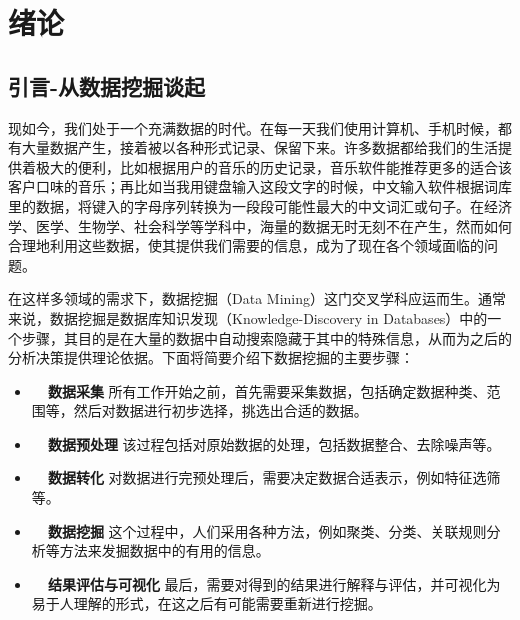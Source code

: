 
\chapter{绪论}
\section{引言-从数据挖掘谈起}
现如今，我们处于一个充满数据的时代。在每一天我们使用计算机、手机时候，都有大量数据产生，接着被以各种形式记录、保留下来。许多数据都给我们的生活提供着极大的便利，比如根据用户的音乐的历史记录，音乐软件能推荐更多的适合该客户口味的音乐；再比如当我用键盘输入这段文字的时候，中文输入软件根据词库里的数据，将键入的字母序列转换为一段段可能性最大的中文词汇或句子。在经济学、医学、生物学、社会科学等学科中，海量的数据无时无刻不在产生，然而如何合理地利用这些数据，使其提供我们需要的信息，成为了现在各个领域面临的问题。

在这样多领域的需求下，数据挖掘（Data Mining）这门交叉学科应运而生。通常来说，数据挖掘是数据库知识发现（Knowledge-Discovery in Databases）中的一个步骤，其目的是在大量的数据中自动搜索隐藏于其中的特殊信息，从而为之后的分析决策提供理论依据。下面将简要介绍下数据挖掘的主要步骤：
\vspace{4mm}
\begin{itemize}
    \item \textbf{~~数据采集} 所有工作开始之前，首先需要采集数据，包括确定数据种类、范围等，然后对数据进行初步选择，挑选出合适的数据。
    \item \textbf{~~数据预处理} 该过程包括对原始数据的处理，包括数据整合、去除噪声等。
    \item \textbf{~~数据转化} 对数据进行完预处理后，需要决定数据合适表示，例如特征选筛等。
    \item \textbf{~~数据挖掘} 这个过程中，人们采用各种方法，例如聚类、分类、关联规则分析等方法来发掘数据中的有用的信息。
    \item \textbf{~~结果评估与可视化} 最后，需要对得到的结果进行解释与评估，并可视化为易于人理解的形式，在这之后有可能需要重新进行挖掘。
\end{itemize}

